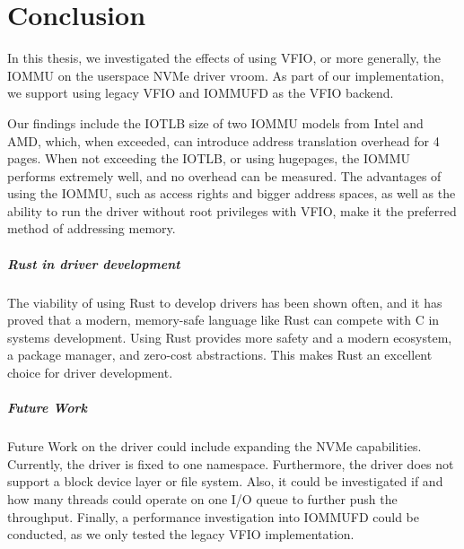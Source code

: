\chapter{Conclusion}
In this thesis, we investigated the effects of using VFIO, or more generally, the IOMMU on the userspace NVMe driver vroom.
As part of our implementation, we support using legacy VFIO and IOMMUFD as the VFIO backend.

Our findings include the IOTLB size of two IOMMU models from Intel and AMD, which, when exceeded, can introduce address translation overhead for \qty{4}{\kibi\byte} pages.
When not exceeding the IOTLB, or using hugepages, the IOMMU performs extremely well, and no overhead can be measured.
The advantages of using the IOMMU, such as access rights and bigger address spaces, as well as the ability to run the driver without root privileges with VFIO, make it the preferred method of addressing memory.

\paragraph{Rust in driver development}
The viability of using Rust to develop drivers has been shown often, and it has proved that a modern, memory-safe language like Rust can compete with C in systems development. Using Rust provides more safety and a modern ecosystem, a package manager, and zero-cost abstractions. This makes Rust an excellent choice for driver development.

\paragraph{Future Work}
Future Work on the driver could include expanding the NVMe capabilities. Currently, the driver is fixed to one namespace. Furthermore, the driver does not support a block device layer or file system.
Also, it could be investigated if and how many threads could operate on one I/O queue to further push the throughput. Finally, a performance investigation into IOMMUFD could be conducted, as we only tested the legacy VFIO implementation.